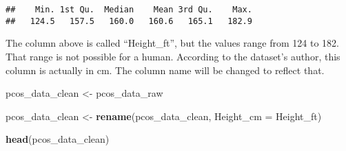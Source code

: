 \documentclass[
]{article}
\newenvironment{Shaded}{\begin{snugshade}}{\end{snugshade}}
\newcommand{\AttributeTok}[1]{\textcolor[rgb]{0.13,0.29,0.53}{#1}}
\newcommand{\FunctionTok}[1]{\textcolor[rgb]{0.13,0.29,0.53}{\textbf{#1}}}
\newcommand{\NormalTok}[1]{#1}
\newcommand{\OtherTok}[1]{\textcolor[rgb]{0.56,0.35,0.01}{#1}}
\begin{document}
\begin{verbatim}
##    Min. 1st Qu.  Median    Mean 3rd Qu.    Max. 
##   124.5   157.5   160.0   160.6   165.1   182.9
\end{verbatim}

The column above is called ``Height\_ft'', but the values range from 124
to 182. That range is not possible for a human. According to the
dataset's author, this column is actually in cm. The column name will be
changed to reflect that.

\begin{Shaded}
\begin{Highlighting}[]
\NormalTok{pcos\_data\_clean }\OtherTok{\textless{}{-}}\NormalTok{ pcos\_data\_raw}
\end{Highlighting}
\end{Shaded}

\begin{Shaded}
\begin{Highlighting}[]
\NormalTok{pcos\_data\_clean }\OtherTok{\textless{}{-}} \FunctionTok{rename}\NormalTok{(pcos\_data\_clean, }\AttributeTok{Height\_cm =}\NormalTok{ Height\_ft)}
\end{Highlighting}
\end{Shaded}

\begin{Shaded}
\begin{Highlighting}[]
\FunctionTok{head}\NormalTok{(pcos\_data\_clean)}
\end{Highlighting}
\end{Shaded}
\end{document}
